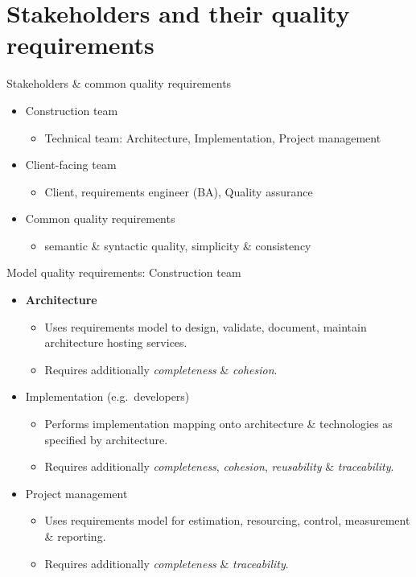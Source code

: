 \section{Stakeholders and their quality requirements}

\begin{frame}{Stakeholders \& common quality requirements}                      
  \begin{itemize} 
    \item<alert@+> Construction team
      \begin{itemize}
	\item Technical team: Architecture, Implementation, Project management
      \end{itemize}
    \item<alert@+> Client-facing team
      \begin{itemize}
	\item Client, requirements engineer (BA), Quality assurance
      \end{itemize}
    \item<alert@+> Common quality requirements
      \begin{itemize}
	\item semantic \& syntactic quality, simplicity \& consistency
      \end{itemize}
  \end{itemize}
\end{frame}


\begin{frame}{Model quality requirements: Construction team}                      
  \begin{itemize} 
    \item<alert@+> {\bf Architecture} 
      \begin{itemize}
        \item Uses requirements model to design, validate, document, maintain architecture hosting services.
        \item Requires additionally {\em completeness} \& {\em cohesion}.
      \end{itemize}
    \item<alert@+> Implementation (e.g.\ developers)
      \begin{itemize}
	\item Performs implementation mapping onto architecture \& technologies as specified by architecture.
	\item Requires additionally {\em completeness}, {\em cohesion}, {\em reusability} \& {\em traceability}.
      \end{itemize}
    \item<alert@+> Project management
      \begin{itemize}
	\item Uses requirements model for estimation, resourcing, control, measurement \& reporting.
	\item Requires additionally {\em completeness} \& {\em traceability}.
      \end{itemize}
  \end{itemize}
\end{frame}

